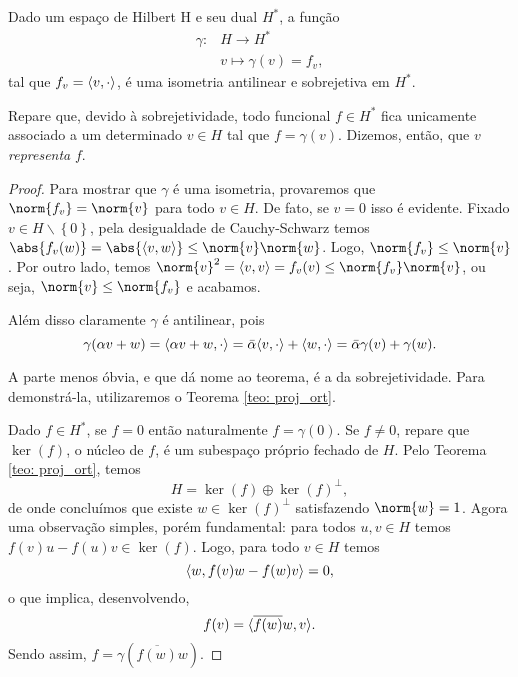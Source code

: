 \begin{teo}
    Dado um espaço de Hilbert H e seu dual \( H^{ * } \), a função
    \begin{align*}
        \gamma : &H \to H^{ * } \\
            &v \mapsto \gamma(v) = f_{ v }
    ,\end{align*}
    tal que \( f_{ v } = \langle v,\cdot\rangle \), é uma isometria antilinear e sobrejetiva em \( H^{ * } \).
\end{teo}
    Repare que, devido à sobrejetividade, todo funcional \( f \in H^{ * } \) fica unicamente associado a um determinado \( v \in H \) tal que \( f = \gamma(v) \).
    Dizemos, então, que \( v \) \emph{representa} \( f \).
\begin{proof}
    Para mostrar que \( \gamma \) é uma isometria, provaremos que \( \norm{ f_{ v } } = \norm{ v } \) para todo \( v \in H \).
    De fato, se \( v = 0 \) isso é evidente.
    Fixado \( v \in H \backslash \left\{ 0 \right\} \), pela desigualdade de Cauchy-Schwarz temos \( \abs{ f_{ v }(w) } = \abs{ \dotprod{v,w} } \leq \norm{ v } \norm{ w } \).
    Logo, \( \norm{ f_{ v } } \leq \norm{ v } \).
    Por outro lado, temos \( \norm{ v }^2 = \dotprod{v,v} = f_{ v }(v) \leq \norm{ f_{ v } } \norm{ v } \), ou seja, \( \norm{ v } \leq \norm{ f_{ v } } \) e acabamos.

    Além disso claramente \( \gamma \) é antilinear, pois \[
        \gamma (\alpha v + w) = \langle\alpha v + w, \cdot\rangle = \bar{\alpha} \langle v, \cdot\rangle + \langle w,\cdot\rangle = \bar{\alpha} \gamma(v) + \gamma(w)
    .\]

    A parte menos óbvia, e que dá nome ao teorema, é a da sobrejetividade.
    Para demonstrá-la, utilizaremos o Teorema \ref{teo: proj_ort}.

    Dado \( f \in H^{ * } \), se \( f = 0 \) então naturalmente \( f = \gamma(0) \).
    Se \( f \neq 0 \), repare que \( \ker(f) \), o núcleo de \( f \), é um subespaço próprio fechado de \( H \).
    Pelo Teorema \ref{teo: proj_ort}, temos \[
        H = \ker(f) \oplus \ker(f)^{ \perp }
    ,\]
    de onde concluímos que existe \( w \in \ker(f)^{ \perp } \) satisfazendo \( \norm{ w } = 1 \).
    Agora uma observação simples, porém fundamental: para todos \( u, v \in H \) temos \( f(v)u - f(u)v \in \ker(f) \).
    Logo, para todo \( v \in H \) temos \[
        \langle w,f(v)w - f(w)v\rangle = 0
    ,\]
    o que implica, desenvolvendo, \[
        f(v) = \langle\overline{f(w)}w,v\rangle
    .\]
    Sendo assim, \( f = \gamma(\overline{f(w)}w) \).
\end{proof}

